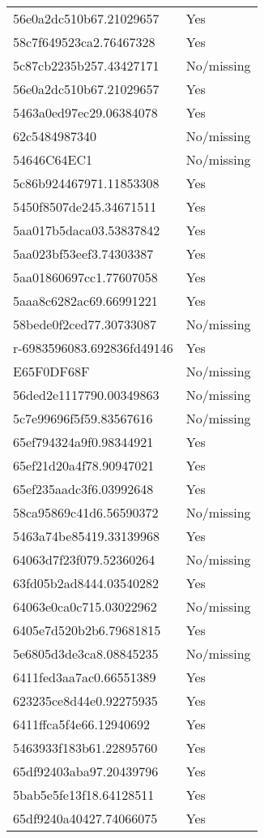 \begin{tabular}{ll}
56e0a2dc510b67.21029657 & Yes \\
58c7f649523ca2.76467328 & Yes \\
5c87cb2235b257.43427171 & No/missing \\
56e0a2dc510b67.21029657 & Yes \\
5463a0ed97ec29.06384078 & Yes \\
62c5484987340 & No/missing \\
54646C64EC1 & No/missing \\
5c86b924467971.11853308 & Yes \\
5450f8507de245.34671511 & Yes \\
5aa017b5daca03.53837842 & Yes \\
5aa023bf53eef3.74303387 & Yes \\
5aa01860697cc1.77607058 & Yes \\
5aaa8c6282ac69.66991221 & Yes \\
58bede0f2ced77.30733087 & No/missing \\
r-6983596083.692836fd49146 & Yes \\
E65F0DF68F & No/missing \\
56ded2e1117790.00349863 & No/missing \\
5c7e99696f5f59.83567616 & No/missing \\
65ef794324a9f0.98344921 & Yes \\
65ef21d20a4f78.90947021 & Yes \\
65ef235aadc3f6.03992648 & Yes \\
58ca95869c41d6.56590372 & No/missing \\
5463a74be85419.33139968 & Yes \\
64063d7f23f079.52360264 & No/missing \\
63fd05b2ad8444.03540282 & Yes \\
64063e0ca0c715.03022962 & No/missing \\
6405e7d520b2b6.79681815 & Yes \\
5e6805d3de3ca8.08845235 & No/missing \\
6411fed3aa7ac0.66551389 & Yes \\
623235ce8d44e0.92275935 & Yes \\
6411ffca5f4e66.12940692 & Yes \\
5463933f183b61.22895760 & Yes \\
65df92403aba97.20439796 & Yes \\
5bab5e5fe13f18.64128511 & Yes \\
65df9240a40427.74066075 & Yes \\

\end{tabular}
